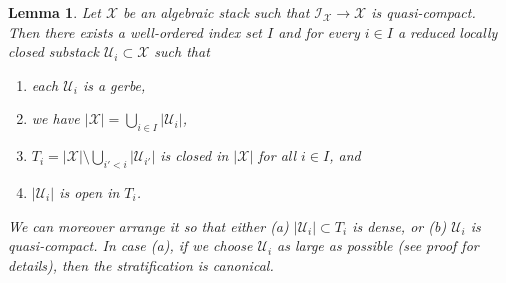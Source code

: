 \documentclass[10pt,a4paper]{amsart}
\theoremstyle{plain}
\newtheorem{lemma}[subsection]{Lemma}
\theoremstyle{definition}
\theoremstyle{remark}
\numberwithin{equation}{subsection}
\begin{document}
\begin{lemma}
\label{lemma-every-point-in-a-stratum}
Let $\mathcal{X}$ be an algebraic stack such that
$\mathcal{I}_\mathcal{X} \to \mathcal{X}$ is quasi-compact.
Then there exists a well-ordered index set $I$ and for every $i \in I$
a reduced locally closed substack $\mathcal{U}_i \subset \mathcal{X}$ such that
\begin{enumerate}
\item each $\mathcal{U}_i$ is a gerbe,
\item we have $|\mathcal{X}| = \bigcup_{i \in I} |\mathcal{U}_i|$,
\item $T_i = |\mathcal{X}| \setminus \bigcup_{i' < i} |\mathcal{U}_{i'}|$
is closed in $|\mathcal{X}|$ for all $i \in I$, and
\item $|\mathcal{U}_i|$ is open in $T_i$.
\end{enumerate}
We can moreover arrange it so that either (a) $|\mathcal{U}_i| \subset T_i$
is dense, or (b) $\mathcal{U}_i$ is quasi-compact. In case (a), if
we choose $\mathcal{U}_i$ as large as possible (see proof for details), then
the stratification is canonical.
\end{lemma}
\end{document}
